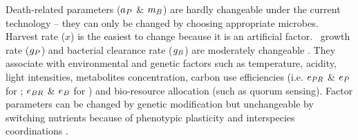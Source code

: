 \documentclass[../thesis.tex]{subfiles} %
\begin{document}
Death-related parameters ($a_P$ \& $m_B$) are hardly changeable under the current technology -- they can only be changed by choosing appropriate microbes.  Harvest rate ($x$) is the easiest to change because it is an artificial factor.  \Phy\ growth rate ($g_P$) and bacterial clearance rate ($g_B$) are moderately changeable \autocite{park2020potential}.  They associate with environmental and genetic factors such as temperature, acidity, light intensities, metabolites concentration, carbon use efficiencies (i.e. $e_{PR}$ \& $e_P$ for \phy; $e_{BR}$ \& $e_B$ for \bac) and bio-resource allocation (such as quorum sensing).  Factor parameters can be changed by genetic modification \autocite{moniruzzaman1996ethanol} but unchangeable by switching nutrients because of phenotypic plasticity \autocite{j1989respiration,bratbak1985phytoplankton,samejima1958heterotrophic} and interspecies coordinations \autocite{beliaev2014inference,amin2012interactions}.
\end{document}
